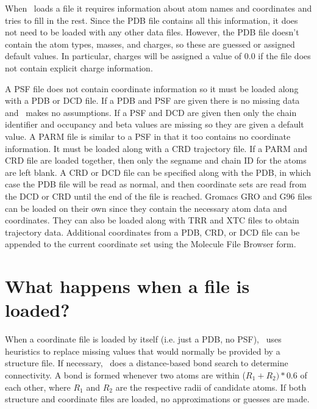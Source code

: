 When \VMD\ loads a file it requires information about atom names and
coordinates and tries to fill in the rest.  Since the PDB file
contains all this information, it does not need to be loaded with any
other data files.  However, the PDB file doesn't contain the atom
types, masses, and charges, so these are guessed or assigned default
values.  In particular, charges will be assigned a value of 0.0 if the
file does not contain explicit charge information.

A PSF file does not contain coordinate information so it must be
loaded along with a PDB or DCD file.  If a PDB and PSF are given there
is no missing data and \VMD\ makes no assumptions.  If a PSF and DCD
are given then only the chain identifier and occupancy and beta values
are missing so they are given a default value.
A PARM file is similar to a PSF in that it too contains no coordinate
information.  It must be loaded along with a CRD trajectory file.
If a PARM and CRD file are loaded together, then only the segname and
chain ID for the atoms are left blank.  
A CRD or DCD file can be specified along with the PDB, in which case
the PDB file will be read as normal, and then coordinate sets are read
from the DCD or CRD until the end of the file is reached.
Gromacs GRO and G96 files can be loaded on their own since they contain
the necessary atom data and coordinates.  They can also be loaded
along with TRR and XTC files to obtain trajectory data.
Additional coordinates from a PDB, CRD, or DCD file can be appended to
the current coordinate set using the {\sf Molecule File Browser} form.



\section{What happens when a file is loaded?}
\label{ug:topic:filetypes:loading}
When a coordinate file is loaded by itself (i.e. just a PDB, no PSF),
\VMD\ uses heuristics to replace missing values that would normally 
be provided by a structure file.  If necessary, \VMD\ does a 
distance-based bond search  to determine
connectivity.  A bond is formed whenever two atoms are within 
($R_1 + R_2) * 0.6$ of each other, where $R_1$ and $R_2$ 
are the respective radii of candidate atoms.
If both structure and coordinate files are loaded, 
no approximations or guesses are made.  

